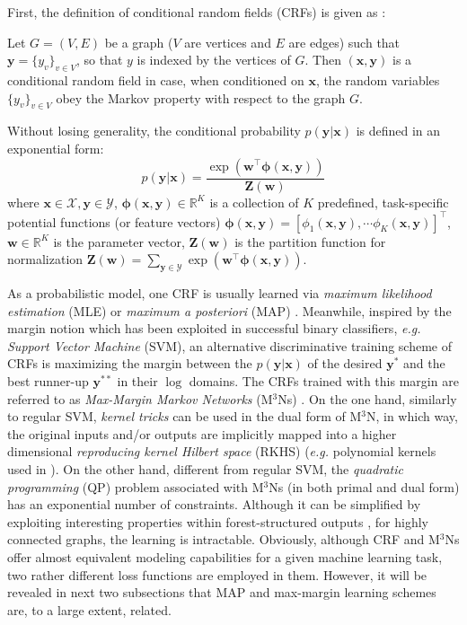 First, the definition of conditional random fields (CRFs) is given as \citep{CRF}: 
\begin{definition}
    Let $G=(V,E)$ be a graph ($V$ are vertices and $E$ are edges) such that $\mathbf{y}=\{y_v\}_{v\in V}$, so that $y$ is indexed by the vertices of $G$. Then $(\mathbf{x,y})$ is a 
        conditional random field in case, when conditioned on $\mathbf{x}$, the random variables $\{y_v\}_{v\in V}$ obey the Markov property with respect to 
    the graph $G$.   
\label{def:CRF}
\end{definition}
Without losing generality, the conditional probability $p(\mathbf{y|x})$ is defined in an exponential form: 
\begin{equation}
    p(\mathbf{y|x})=\frac{\exp(\mathbf{w}^\top \boldsymbol{\phi}(\mathbf{x,y}))}{\mathbf{Z(w)}}
\end{equation}
where $\mathbf{x}\in\mathcal{X},\mathbf{y}\in\mathcal{Y}$, $\boldsymbol{\phi}(\mathbf{x,y})\in\mathbb{R}^K$ is a collection of $K$ predefined, task-specific potential functions  (or feature vectors)
$\boldsymbol{\phi}(\mathbf{x,y})=[\phi_1(\mathbf{x,y}),\cdots \phi_K(\mathbf{x,y})]^\top$, $\mathbf{w}\in\mathbb{R}^K$ is the parameter vector,  
$\mathbf{Z(w)}$ is the partition function for normalization $\mathbf{Z(w)}=\sum_{\mathbf{y}\in\mathcal{Y}} \exp(\mathbf{w}^\top \boldsymbol{\phi}(\mathbf{x,y}))$. 

As a probabilistic model, one CRF is usually 
learned via \emph{maximum likelihood estimation} (MLE) or \emph{maximum a posteriori} (MAP) \citep{Kumar03,CRF,Accelerated_CRF}. 
Meanwhile, inspired by the margin notion which has been exploited in successful binary classifiers, \emph{e.g.} \emph{Support Vector Machine} (SVM),  
an alternative discriminative training scheme of CRFs is maximizing the margin between 
the $p(\mathbf{y|x})$ of the desired $\mathbf{y^*}$ and the best runner-up $\mathbf{y}^{**}$  in their $\log$ domains. The CRFs trained with this 
margin
are referred to as 
\emph{Max-Margin Markov Networks} (M$^3$Ns) \citep{Taskar03}. 
On the one hand, similarly to regular SVM, \emph{kernel tricks} can be used in the dual form of M$^3$N, in which way, the original inputs and/or outputs are implicitly mapped into a higher 
dimensional \emph{reproducing kernel Hilbert space} (RKHS) (\emph{e.g.} polynomial kernels used in \cite{Taskar03}).     
On the other hand, different from regular SVM, the \emph{quadratic programming} 
(QP) problem associated with M$^3$Ns (in both primal and dual form) has an exponential number of constraints. 
Although it can be simplified by exploiting interesting properties within forest-structured outputs \citep{Taskar03},  
for highly connected graphs, the learning is intractable.      
Obviously, although CRF and  M$^3$Ns offer almost equivalent modeling capabilities for a given machine learning task, two rather different loss functions are 
employed in them. However, it will be revealed in next two subsections that MAP and max-margin learning schemes are, to a large extent, related. 

